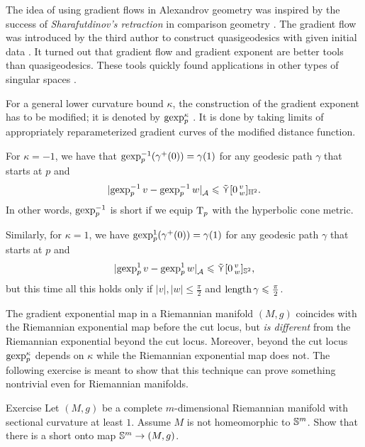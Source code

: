 The idea of using gradient flows in Alexandrov geometry was inspired by the success of \emph{Sharafutdinov's retraction} in comparison geometry \cite{sharafutdinov}.
The gradient flow was introduced by the third author to construct quasigeodesics with given initial data \cite{perelman-petrunin:qg,petrunin:qg, petrunin:survey}.
It turned out that gradient flow and gradient exponent are better tools than quasigeodesics.
These tools quickly found applications in other types of singular spaces \cite{jost,mayer,lytchak:open-map,ohta,sevare,ambrosio-gigli-savare}.

For a general lower curvature bound $\kappa$, the construction of the gradient exponent has to be modified;
it is denoted by $\operatorname{\rm gexp}\nolimits_p^\kappa$ \cite[16.36]{alexander-kapovitch-petrunin2024}. It is done by taking limits of appropriately reparameterized gradient curves of the modified distance function.

For $\kappa=-1$, we have
that $\operatorname{\rm gexp}\nolimits_p^{-1}(\gamma^+(0))=\gamma(1)$
for any geodesic path $\gamma$ that starts at $p$
and 
\[\dist{\gexp_p^{-1}v}{\gexp_p^{-1}w}{\spc{A}}\le \side\hinge0vw_{\HH^2}.\]
In other words, $\operatorname{\rm gexp}\nolimits_p^{-1}$ is short if we equip $\mathrm{T}_p$ with the hyperbolic cone metric.

Similarly, for $\kappa=1$, we have $\operatorname{\rm gexp}\nolimits_p^1(\gamma^+(0))=\gamma(1)$
for any geodesic path $\gamma$ that starts at $p$ and 
\[\dist{\gexp_p^{1}v}{\gexp_p^{1}w}{\spc{A}}\le \side\hinge0vw_{\SSS^2},\]
but this time all this holds only if $|v|,|w|\le\tfrac\pi2$ and $\mathop{\rm length}\nolimits\gamma\leqslant\tfrac\pi2$.

The gradient exponential map in a Riemannian manifold $(M,g)$ coincides with the Riemannian exponential map before the cut locus, but \textit{is different} from the Riemannian exponential beyond the cut locus.
Moreover, beyond the cut locus $\operatorname{\rm gexp}\nolimits_p^\kappa$ depends on $\kappa$ while the Riemannian exponential map does not.
The following exercise is meant to show that this technique can prove something nontrivial even for Riemannian manifolds.

\begin{thm}{Exercise}\label{ex:short-onto}
Let $(M,g)$ be a complete $m$-dimensional Riemannian manifold with sectional curvature at least $1$.
Assume $M$ is not homeomorphic to $\mathbb{S}^m$.
Show that there is a short onto map $\SSS^m\z\to (M,g)$.
\end{thm}
